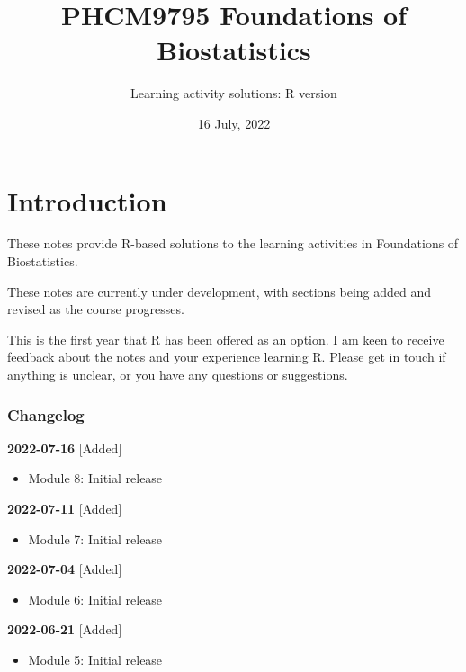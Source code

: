 \documentclass[
]{memoir}
\title{PHCM9795 Foundations of Biostatistics}
\author{Learning activity solutions: R version}
\date{16 July, 2022}
\providecommand{\tightlist}{%
  \setlength{\itemsep}{0pt}\setlength{\parskip}{0pt}}
\begin{document}
\maketitle

{
\setcounter{tocdepth}{1}
\tableofcontents
}
\hypertarget{introduction}{%
\chapter*{Introduction}\label{introduction}}

These notes provide R-based solutions to the learning activities in Foundations of Biostatistics.

These notes are currently under development, with sections being added and revised as the course progresses.

This is the first year that R has been offered as an option. I am keen to receive feedback about the notes and your experience learning R. Please \href{mailto:t.dobbins@unsw.edu.au}{get in touch} if anything is unclear, or you have any questions or suggestions.

\hypertarget{changelog}{%
\subsection*{Changelog}\label{changelog}}

\textbf{2022-07-16}
{[}Added{]}

\begin{itemize}
\tightlist
\item
  Module 8: Initial release
\end{itemize}

\textbf{2022-07-11}
{[}Added{]}

\begin{itemize}
\tightlist
\item
  Module 7: Initial release
\end{itemize}

\textbf{2022-07-04}
{[}Added{]}

\begin{itemize}
\tightlist
\item
  Module 6: Initial release
\end{itemize}

\textbf{2022-06-21}
{[}Added{]}

\begin{itemize}
\tightlist
\item
  Module 5: Initial release
\end{itemize}
\end{document}
